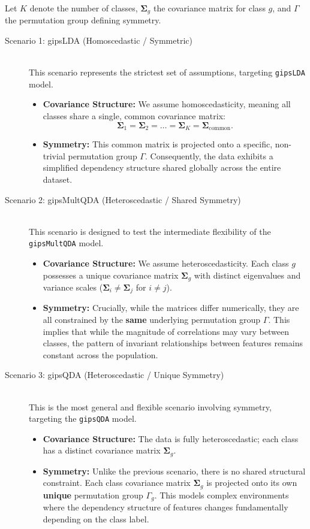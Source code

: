 \documentclass[a4paper,11pt,twoside]{report}
\theoremstyle{definition}
\begin{document}
Let $K$ denote the number of classes, $\boldsymbol{\Sigma}_g$ the covariance matrix for class $g$, and $\Gamma$ the permutation group defining symmetry.

\begin{description}
    \item[Scenario 1: gipsLDA (Homoscedastic / Symmetric)] \hfill \\
    This scenario represents the strictest set of assumptions, targeting \texttt{gipsLDA} model.
    \begin{itemize}
        \item \textbf{Covariance Structure:} We assume homoscedasticity, meaning all classes share a single, common covariance matrix:
        \[ \boldsymbol{\Sigma}_1 = \boldsymbol{\Sigma}_2 = \dots = \boldsymbol{\Sigma}_K = \boldsymbol{\Sigma}_{\text{common}}. \]
        \item \textbf{Symmetry:} This common matrix is projected onto a specific, non-trivial permutation group $\Gamma$. Consequently, the data exhibits a simplified dependency structure shared globally across the entire dataset.
    \end{itemize}

    \item[Scenario 2: gipsMultQDA (Heteroscedastic / Shared Symmetry)] \hfill \\
    This scenario is designed to test the intermediate flexibility of the \texttt{gipsMultQDA} model.
    \begin{itemize}
        \item \textbf{Covariance Structure:} We assume heteroscedasticity. Each class $g$ possesses a unique covariance matrix $\boldsymbol{\Sigma}_g$ with distinct eigenvalues and variance scales ($\boldsymbol{\Sigma}_i \neq \boldsymbol{\Sigma}_j$ for $i \neq j$).
        \item \textbf{Symmetry:} Crucially, while the matrices differ numerically, they are all constrained by the \textbf{same} underlying permutation group $\Gamma$. This implies that while the magnitude of correlations may vary between classes, the pattern of invariant relationships between features remains constant across the population.
    \end{itemize}

    \item[Scenario 3: gipsQDA (Heteroscedastic / Unique Symmetry)] \hfill \\
    This is the most general and flexible scenario involving symmetry, targeting the \texttt{gipsQDA} model.
    \begin{itemize}
        \item \textbf{Covariance Structure:} The data is fully heteroscedastic; each class has a distinct covariance matrix $\boldsymbol{\Sigma}_g$.
        \item \textbf{Symmetry:} Unlike the previous scenario, there is no shared structural constraint. Each class covariance matrix $\boldsymbol{\Sigma}_g$ is projected onto its own \textbf{unique} permutation group $\Gamma_g$. This models complex environments where the dependency structure of features changes fundamentally depending on the class label.
    \end{itemize}


\end{description}
\end{document}

